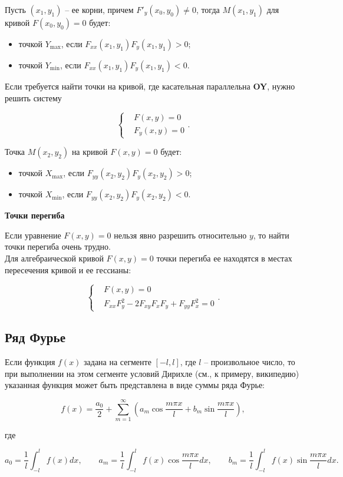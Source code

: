 Пусть $\left( x_{1}, y_{1} \right)$ -- ее корни, причем $F'_{y} \left( x_{0}, y_{0} \right) \neq 0$, тогда $M \left( x_{1}, y_{1} \right)$ для кривой $F \left( x_{0}, y_{0} \right) = 0$ будет:

\begin{itemize}
	\item точкой $Y_{\max}$, если $F_{xx} \left( x_{1}, y_{1} \right) F_{y} \left( x_{1}, y_{1} \right) > 0$;
	
	\item точкой $Y_{\min}$, если $F_{xx} \left( x_{1}, y_{1} \right) F_{y} \left( x_{1}, y_{1} \right) < 0$.
\end{itemize}

Если требуется найти точки на кривой, где касательная параллельна \textbf{OY}, нужно решить систему

\[
\begin{cases}
& F \left( x, y \right) = 0\\
& F_{y} \left( x, y \right) = 0
\end{cases}.
\]

Точка $M \left( x_{2}, y_{2} \right)$ на кривой $F \left( x, y \right) = 0$ будет:

\begin{itemize}
	\item точкой $X_{\max}$, если $F_{yy} \left( x_{2}, y_{2} \right) F_{y} \left( x_{2}, y_{2} \right) > 0$;
	
	\item точкой $X_{\min}$, если $F_{yy} \left( x_{2}, y_{2} \right) F_{y} \left( x_{2}, y_{2} \right) < 0$.
\end{itemize} 

\textbf{Точки перегиба}

Если уравнение $F \left( x, y \right) = 0$ нельзя явно разрешить относительно $y$, то найти точки перегиба очень трудно.\\

Для алгебраической кривой $F \left( x, y \right) = 0$ точки перегиба ее находятся в местах пересечения кривой и ее гессианы:

\[
\begin{cases}
& F \left( x, y \right) = 0\\
& F_{xx} F^{2}_{y} - 2 F_{xy} F_{x} F_{y} + F_{yy} F^{2}_{x} = 0
\end{cases}.
\]

\subsection{Ряд Фурье}

Если функция $f(x)$ задана на сегменте $[-l,l]$, где $l$ -- произвольное число, то при выполнении на этом сегменте условий Дирихле (см., к примеру, википедию) указанная функция может быть представлена в виде суммы ряда Фурье:

\[
f(x) = \frac{a_{0}}{2} + \sum_{m = 1}^{\infty} \left( a_{m} \cos \frac{m \pi x}{l} + b_{m} \sin \frac{m \pi x}{l} \right),
\]

где

\[
a_{0} =  \frac{1}{l} \int_{-l}^{l} f(x) dx, \qquad a_{m} = \frac{1}{l} \int_{-l}^{l} f(x) \cos \frac{m \pi x}{l} dx, \qquad b_{m} = \frac{1}{l} \int_{-l}^{l} f(x) \sin \frac{m \pi x}{l} dx.
\]